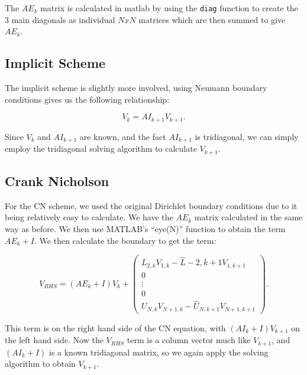\documentclass[11pt]{article}
\begin{document}
The $AE_k$ matrix is calculated in matlab by using the \verb|diag| function to create the 3 main diagonals as individual $NxN$ matrices which are 
then summed to give $AE_k$.

\subsection{Implicit Scheme}
The implicit scheme is slightly more involved, using Neumann boundary conditions gives us the following relationship:

\[
    V_k = AI_{k+1}V_{k+1}.  
\]

Since $V_k$ and $AI_{k+1}$ are known, and the fact $AI_{k+1}$ is tridiagonal, we can simply employ the tridiagonal solving algorithm 
to calculate $V_{k+1}$.

\subsection{Crank Nicholson}
For the CN scheme, we used the original Dirichlet boundary conditions due to it being relatively easy to calculate. 
We have the $AE_k$ matrix calculated in the same way as before. We then use MATLAB's ``eye(N)'' function to obtain the term 
$AE_k + I$. We then calculate the boundary to get the term: 

\[
    V_{RHS} = (AE_k+I)V_{k} +
    \begin{pmatrix}
        L_{2,k}V_{1,k} - \hat{L}-{2,k+1}V_{1,k+1} \\
        0 \\
        \vdots \\
        0\\
        U_{N,k}V_{N+1,k} - \hat{U}_{N,k+1}V_{N+1,k+1}
    \end{pmatrix}.
\]

This term is on the right hand side of the CN equation, with $(AI_k+I)V_{k+1}$ on the left hand side. Now the $V_{RHS}$ term is a column vector 
much like $V_{k+1}$, and $(AI_k + I)$ is a known tridiagonal matrix, so we again apply the solving algorithm to obtain $V_{k+1}$. 
\end{document}
